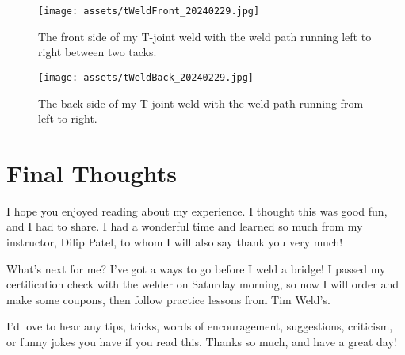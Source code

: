 \documentclass{article}
\begin{document}
\begin{figure}[h]
\caption{The front side of my T-joint weld with the weld path running left to right between two tacks.}
\texttt{[image: assets/tWeldFront\_20240229.jpg]}
\label{tJoint1}
\end{figure}

\begin{figure}[h]
\caption{The back side of my T-joint weld with the weld path running from left to right.}
\texttt{[image: assets/tWeldBack\_20240229.jpg]}
\label{tJoint2}
\end{figure}

\section*{Final Thoughts}

I hope you enjoyed reading about my experience. I thought this was good fun, and I had to share. I had a wonderful time and learned so much from my instructor, Dilip Patel, to whom I will also say thank you very much!

What's next for me? I've got a ways to go before I weld a bridge! I passed my certification check with the welder on Saturday morning, so now I will order and make some coupons, then follow practice lessons from Tim Weld's.

I'd love to hear any tips, tricks, words of encouragement, suggestions, criticism, or funny jokes you have if you read this. Thanks so much, and have a great day!
\end{document}
